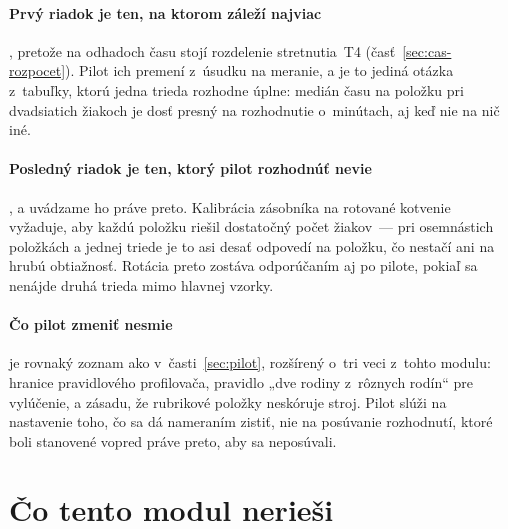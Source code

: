 \paragraph{Prvý riadok je ten, na ktorom záleží najviac}, pretože na odhadoch
času stojí rozdelenie stretnutia~T4 (časť~\ref{sec:cas-rozpocet}). Pilot ich
premení z~úsudku na meranie, a je to jediná otázka z~tabuľky, ktorú jedna trieda
rozhodne úplne: medián času na položku pri dvadsiatich žiakoch je dosť presný na
rozhodnutie o~minútach, aj keď nie na nič iné.

\paragraph{Posledný riadok je ten, ktorý pilot rozhodnúť nevie}, a uvádzame ho
práve preto. Kalibrácia zásobníka na rotované kotvenie vyžaduje, aby každú
položku riešil dostatočný počet žiakov~--- pri osemnástich položkách a jednej
triede je to asi desať odpovedí na položku, čo nestačí ani na hrubú obtiažnosť.
Rotácia preto zostáva odporúčaním aj po pilote, pokiaľ sa nenájde druhá trieda
mimo hlavnej vzorky.

\paragraph{Čo pilot zmeniť nesmie} je rovnaký zoznam ako v~časti~\ref{sec:pilot},
rozšírený o~tri veci z~tohto modulu: hranice pravidlového profilovača, pravidlo
„dve rodiny z~rôznych rodín“ pre vylúčenie, a zásadu, že rubrikové položky
neskóruje stroj. Pilot slúži na nastavenie toho, čo sa dá nameraním zistiť, nie
na posúvanie rozhodnutí, ktoré boli stanovené vopred práve preto, aby sa
neposúvali.

\section{Čo tento modul nerieši}
\label{sec:modul-limity}

